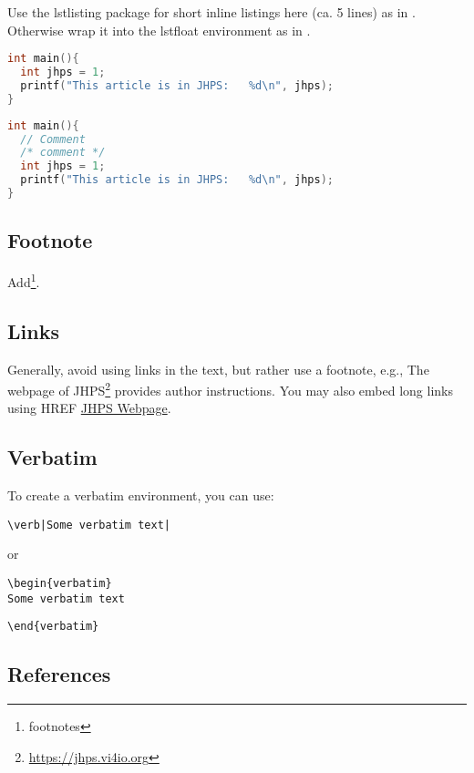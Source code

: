 \documentclass{jhps}
\begin{document}
Use the lstlisting package for short inline listings here (ca.
5 lines) as in .
Otherwise wrap it into the lstfloat environment as in .

\begin{lstlisting}[caption="My listing",label=lst:listing,language=C,inputencoding={utf8},extendedchars=false]
int main(){
  int jhps = 1;
  printf("This article is in JHPS:   %d\n", jhps);
}
\end{lstlisting}

\begin{lstfloat}[h]
  \begin{lstlisting}[caption="My longer listing",label={lst:longlisting},language=C]
int main(){
  // Comment
  /* comment */
  int jhps = 1;
  printf("This article is in JHPS:   %d\n", jhps);
}
  \end{lstlisting}
\end{lstfloat}


\subsection{Footnote}
Add\footnote{footnotes}.

\subsection{Links}
Generally, avoid using links in the text, but rather use a footnote, e.g.,
The webpage of JHPS\footnote{\url{https://jhps.vi4io.org}} provides author instructions.
You may also embed long links using HREF \href{https://jhps.vi4io.org}{JHPS Webpage}.

\subsection{Verbatim}
To create a verbatim environment, you can use:
\begin{verbatim}
\verb|Some verbatim text|
\end{verbatim}
or
\begin{verbatim}
\begin{verbatim}
Some verbatim text
\end{verbatim}
\vspace*{-0.8em}
\verb|\end{verbatim}|

\subsection{References}
\end{document}
